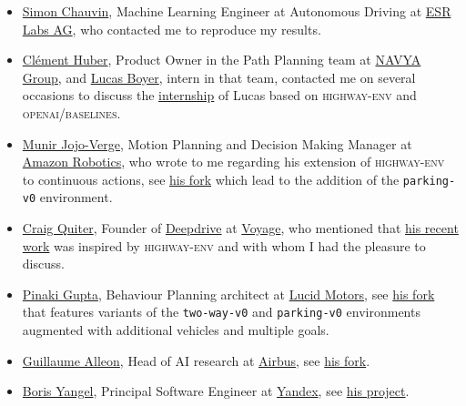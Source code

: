 \begin{itemize}
    \item \href{https://www.linkedin.com/in/simon-chauvin/}{Simon Chauvin}, Machine Learning Engineer at Autonomous Driving at \href{https://www.esrlabs.com/}{ESR Labs AG}, who contacted me to reproduce my results.
	\item \href{https://www.linkedin.com/in/huberclement}{Clément Huber}, Product Owner in the Path Planning team at \href{https://navya.tech/fr/}{NAVYA Group}, and \href{https://www.linkedin.com/in/lucas-boyer}{Lucas Boyer}, intern in that team, contacted me on several occasions to discuss the \href{https://github.com/lucasBOYER/highway-env}{internship} of Lucas based on \textsc{highway-env} and \textsc{openai/baselines}.
	\item \href{https://www.linkedin.com/in/munirjojoverge}{Munir Jojo-Verge}, Motion Planning and Decision Making Manager at \href{https://canvas.technology/}{Amazon Robotics}, who wrote to me regarding his extension of \textsc{highway-env} to continuous actions, see \href{https://github.com/munirjojoverge/rl_AD_urban_baselines}{his fork} which lead to the addition of the \texttt{parking-v0} environment.
	\item \href{https://www.linkedin.com/in/deepdrive}{Craig Quiter}, Founder of \href{https://deepdrive.voyage.auto/}{Deepdrive} at \href{https://voyage.auto/}{Voyage}, who mentioned that \href{https://medium.com/@crizcraig/smooth-operator-92c6c14862fb}{his recent work} was inspired by \textsc{highway-env} and with whom I had the pleasure to discuss.
	\item \href{https://www.linkedin.com/in/pinaki-gupta/}{Pinaki Gupta}, Behaviour Planning architect at \href{https://lucidmotors.com/}{Lucid Motors}, see \href{https://github.com/pinakigupta/BehaviorRL}{his fork} that features variants of the \texttt{two-way-v0} and \texttt{parking-v0} environments augmented with additional vehicles and multiple goals.
	\item \href{https://www.linkedin.com/in/guillaumealleon}{Guillaume Alleon}, Head of AI research at \href{https://www.airbus.com/}{Airbus}, see \href{https://github.com/galleon/highway-env}{his fork}.
    \item \href{https://ru.linkedin.com/in/boris-yangel-83194729}{Boris Yangel}, Principal Software Engineer at \href{https://yandex.com/}{Yandex}, see \href{https://github.com/hr0nix/trackdays/blob/master/setup.py}{his project}.
\end{itemize}


 


